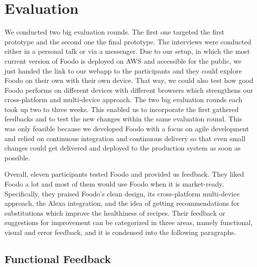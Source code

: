 \chapter{Evaluation}
We conducted two big evaluation rounds. The first one targeted the first prototype and the second one the final prototype. The interviews were conducted either in a personal talk or via a messenger. Due to our setup, in which the most current version of Foodo is deployed on AWS and accessible for the public, we just handed the link to our webapp to the participants and they could explore Foodo on their own with their own device. That way, we could also test how good Foodo performs on different devices with different browsers which strengthens our cross-platform and multi-device approach. The two big evaluation rounds each took up two to three weeks. This enabled us to incorporate the first gathered feedbacks and to test the new changes within the same evaluation round. This was only feasible because we developed Foodo with a focus on agile development and relied on continuous integration and continuous delivery so that even small changes could get delivered and deployed to the production system as soon as possible. 

Overall, eleven participants tested Foodo and provided us feedback. They liked Foodo a lot and most of them would use Foodo when it is market-ready. Specifically, they praised Foodo's clean design, its cross-platform multi-device approach, the Alexa integration, and the idea of getting recommendations for substitutions which improve the healthiness of recipes. Their feedback or suggestions for improvement can be categorized in three areas, namely functional, visual and error feedback, and it is condensed into the following paragraphs.

\section{Functional Feedback}


